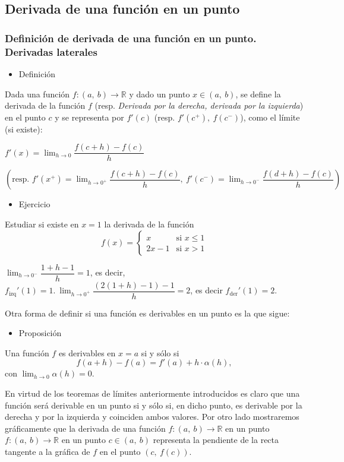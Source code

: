 \subsection{Derivada de una función en un punto}
\subsubsection{Definición de derivada de una función en un punto. Derivadas laterales}
\begin{itemize}[label=\color{red}\textbullet, leftmargin=*]
	\item \color{lightblue}Definición
\end{itemize}
Dada una función $f:(a,~b)\rightarrow\mathbb{R}$ y dado un punto $x\in(a,~b)$, se define la derivada de la función $f$ (resp. \textit{Derivada por la derecha, derivada por la izquierda}) en el punto $c$ y se representa por $f'(c)$ (resp. $f'(c^+),~f(c^-)$), como el límite (si existe):

$f'(x)=\lim_{h\to0}\dfrac{f(c+h)-f(c)}{h}$

$\left(\text{resp. }f'(x^+)=\lim_{h\to0^+}\dfrac{f(c+h)-f(c)}{h},~f'(c^-)=\lim_{h\to0^-}\dfrac{f(d+h)-f(c)}{h}\right)$

\begin{itemize}[label=\color{red}\textbullet, leftmargin=*]
	\item \color{lightblue}Ejercicio
\end{itemize}
{\color{lightblue} Estudiar si existe en $x=1$ la derivada de la función \[ f(x)=\left\lbrace\begin{array}{ll}
		x & \text{si }x\le1\\
		2x-1 &\text{si }x>1
	\end{array}\right. \]}

$\lim_{h\to0^-}\dfrac{1+h-1}{h}=1$, es decir, $f_{\mathrm{izq}}'(1)=1.~\lim_{h\to0^+}\dfrac{(2(1+h)-1)-1}{h}=2$, es decir $f_{\mathrm{der}}'(1)=2$.

Otra forma de definir si una función es derivables en un punto es la que sigue:
\begin{itemize}[label=\color{red}\textbullet, leftmargin=*]
	\item \color{lightblue}Proposición
\end{itemize}
Una función $f$ es derivables en $x=a$ si y sólo si \[ f(a+h)-f(a)=f'(a)+h\cdot \alpha(h), \] con $\lim_{h\to0}\alpha(h)=0$.

En virtud de los teoremas de límites anteriormente introducidos es claro que una función será derivable en un punto si y sólo si, en dicho punto, es derivable por la derecha y por la izquierda y coinciden ambos valores. Por otro lado mostraremos gráficamente que la derivada de una función $f:(a,~b)\rightarrow\mathbb{R}$ en un punto $f:(a,~b)\rightarrow\mathbb{R}$ en un punto $c\in(a,~b)$ representa la pendiente de la recta tangente a la gráfica de $f$ en el punto $(c,~f(c))$.
